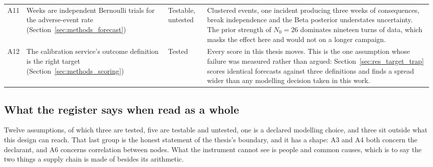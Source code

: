 \begin{longtable}{@{}p{0.5cm} p{4.1cm} p{2.0cm} p{7.6cm}@{}}
A11 & Weeks are independent Bernoulli trials for the adverse-event rate
(Section~\ref{sec:methods_forecast})
& Testable, untested
& Clustered events, one incident producing three weeks of consequences, break independence
and the Beta posterior understates uncertainty. The prior strength of $N_0 = 26$ dominates
nineteen turns of data, which masks the effect here and would not on a longer campaign. \\
\addlinespace

A12 & The calibration service's outcome definition is the right target
(Section~\ref{sec:methods_scoring})
& Tested
& Every score in this thesis moves. This is the one assumption whose failure was measured
rather than argued: Section~\ref{sec:res_target_trap} scores identical forecasts against
three definitions and finds a spread wider than any modelling decision taken in this work. \\

\end{longtable}

\subsection{What the register says when read as a whole}

Twelve assumptions, of which three are tested, five are testable and untested, one is a
declared modelling choice, and three sit outside what this design can reach. That last group is the honest statement of the thesis's
boundary, and it has a shape: A3 and A4 both concern the declarant, and A6 concerns
correlation between nodes. What the instrument cannot see is people and common causes,
which is to say the two things a supply chain is made of besides its arithmetic.

